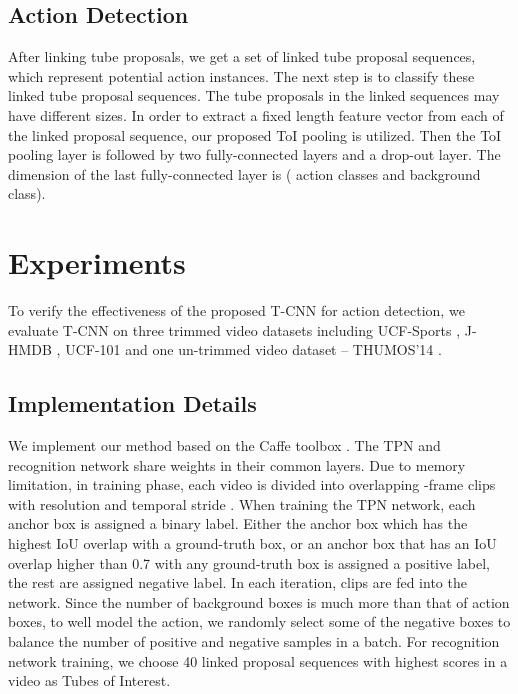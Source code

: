 \documentclass[10pt,twocolumn,letterpaper]{article}
\begin{document}
\subsection{Action Detection}
\label{subsec: recognition}
After linking tube proposals, we get a set of linked tube proposal sequences, which represent potential action instances. The next step is to classify these linked tube proposal sequences. The tube proposals in the linked sequences may have different sizes. In order to extract a fixed length feature vector from each of the linked proposal sequence, our proposed ToI pooling is utilized. Then the ToI pooling layer is followed by two fully-connected layers and a drop-out layer. The dimension of the last fully-connected layer is  ( action classes and  background class). 











\section{Experiments}
\label{sec:experiments}

To verify the effectiveness of the proposed T-CNN for action detection,
we evaluate T-CNN on three trimmed video datasets including UCF-Sports \cite{rodriguez2008action},
J-HMDB \cite{Jhuang:ICCV:2013}, UCF-101 \cite{THUMOS13} and one un-trimmed video dataset -- THUMOS'14 \cite{THUMOS14}.

\subsection{Implementation Details}
\label{subsec:basic_settings}
We implement our method based on the Caffe toolbox \cite{jia2014caffe}. The TPN and recognition network share weights in their common layers. Due to memory limitation, in training phase, each video is divided into overlapping -frame clips with resolution  and temporal stride . When training the TPN network, each anchor box is assigned a binary label. Either the anchor box which has the highest IoU overlap with a ground-truth box, or an anchor box that has an IoU overlap higher than 0.7 with any ground-truth box is assigned a positive label, the rest are assigned negative label. In each iteration,  clips are fed into the network. Since the number of background boxes is much more than that of action boxes, to well model the action, we randomly select some of the negative boxes to balance the number of positive and negative samples in a batch. For recognition network training, we choose 40 linked proposal sequences with highest scores in a video as Tubes of Interest.
\end{document}
